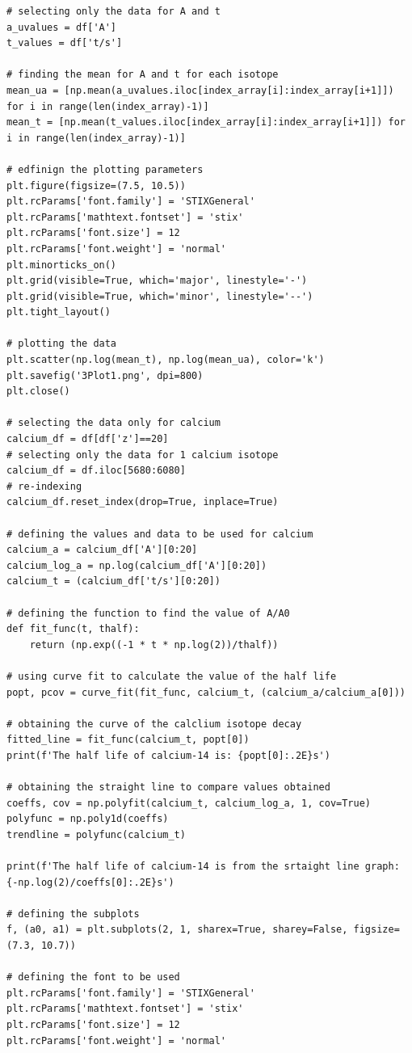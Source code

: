 \documentclass[12pt, a4paper]{article}
\begin{document}
\begin{verbatim}
# selecting only the data for A and t
a_uvalues = df['A']
t_values = df['t/s']

# finding the mean for A and t for each isotope
mean_ua = [np.mean(a_uvalues.iloc[index_array[i]:index_array[i+1]]) for i in range(len(index_array)-1)]
mean_t = [np.mean(t_values.iloc[index_array[i]:index_array[i+1]]) for i in range(len(index_array)-1)]

# edfinign the plotting parameters
plt.figure(figsize=(7.5, 10.5))
plt.rcParams['font.family'] = 'STIXGeneral'
plt.rcParams['mathtext.fontset'] = 'stix'
plt.rcParams['font.size'] = 12
plt.rcParams['font.weight'] = 'normal'
plt.minorticks_on()
plt.grid(visible=True, which='major', linestyle='-')
plt.grid(visible=True, which='minor', linestyle='--')
plt.tight_layout()

# plotting the data
plt.scatter(np.log(mean_t), np.log(mean_ua), color='k')
plt.savefig('3Plot1.png', dpi=800)
plt.close()

# selecting the data only for calcium
calcium_df = df[df['z']==20]
# selecting only the data for 1 calcium isotope
calcium_df = df.iloc[5680:6080]
# re-indexing
calcium_df.reset_index(drop=True, inplace=True)

# defining the values and data to be used for calcium
calcium_a = calcium_df['A'][0:20]
calcium_log_a = np.log(calcium_df['A'][0:20])
calcium_t = (calcium_df['t/s'][0:20])

# defining the function to find the value of A/A0
def fit_func(t, thalf):
    return (np.exp((-1 * t * np.log(2))/thalf))

# using curve fit to calculate the value of the half life
popt, pcov = curve_fit(fit_func, calcium_t, (calcium_a/calcium_a[0]))

# obtaining the curve of the calclium isotope decay
fitted_line = fit_func(calcium_t, popt[0])
print(f'The half life of calcium-14 is: {popt[0]:.2E}s')

# obtaining the straight line to compare values obtained
coeffs, cov = np.polyfit(calcium_t, calcium_log_a, 1, cov=True)
polyfunc = np.poly1d(coeffs)
trendline = polyfunc(calcium_t)

print(f'The half life of calcium-14 is from the srtaight line graph: {-np.log(2)/coeffs[0]:.2E}s')

# defining the subplots
f, (a0, a1) = plt.subplots(2, 1, sharex=True, sharey=False, figsize=(7.3, 10.7))

# defining the font to be used
plt.rcParams['font.family'] = 'STIXGeneral'
plt.rcParams['mathtext.fontset'] = 'stix'
plt.rcParams['font.size'] = 12
plt.rcParams['font.weight'] = 'normal'


\end{verbatim}
\end{document}
